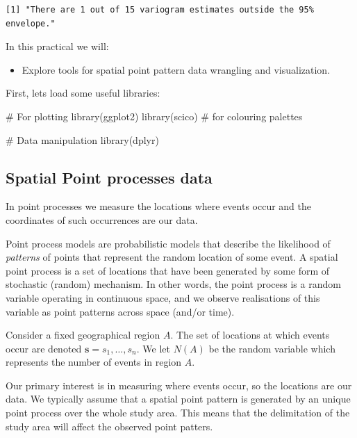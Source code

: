 \documentclass[
  letterpaper,
  DIV=11,
  numbers=noendperiod]{scrartcl}
\newenvironment{Shaded}{\begin{snugshade}}{\end{snugshade}}
\newcommand{\CommentTok}[1]{\textcolor[rgb]{0.37,0.37,0.37}{#1}}
\newcommand{\FunctionTok}[1]{\textcolor[rgb]{0.28,0.35,0.67}{#1}}
\newcommand{\NormalTok}[1]{\textcolor[rgb]{0.00,0.23,0.31}{#1}}
\providecommand{\tightlist}{%
  \setlength{\itemsep}{0pt}\setlength{\parskip}{0pt}}\usepackage{longtable,booktabs,array}
\begin{document}
\begin{verbatim}
[1] "There are 1 out of 15 variogram estimates outside the 95% envelope."
\end{verbatim}

In this practical we will:

\begin{itemize}
\tightlist
\item
  Explore tools for spatial point pattern data wrangling and
  visualization.
\end{itemize}

First, lets load some useful libraries:

\begin{Shaded}
\begin{Highlighting}[]
\CommentTok{\# For plotting}
\FunctionTok{library}\NormalTok{(ggplot2)}
\FunctionTok{library}\NormalTok{(scico) }\CommentTok{\# for colouring palettes}

\CommentTok{\# Data manipulation}
\FunctionTok{library}\NormalTok{(dplyr)}
\end{Highlighting}
\end{Shaded}

\subsection{Spatial Point processes
data}\label{spatial-point-processes-data}

In point processes we measure the locations where events occur and the
coordinates of such occurrences are our data.

Point process models are probabilistic models that describe the
likelihood of \emph{patterns} of points that represent the random
location of some event. A spatial point process is a set of locations
that have been generated by some form of stochastic (random) mechanism.
In other words, the point process is a random variable operating in
continuous space, and we observe realisations of this variable as point
patterns across space (and/or time).

Consider a fixed geographical region \(A\). The set of locations at
which events occur are denoted \(\mathbf{s} = s_1,\ldots,s_n\). We let
\(N(A)\) be the random variable which represents the number of events in
region \(A\).

Our primary interest is in measuring where events occur, so the
locations are our data. We typically assume that a spatial point pattern
is generated by an unique point process over the whole study area. This
means that the delimitation of the study area will affect the observed
point patters.
\end{document}
